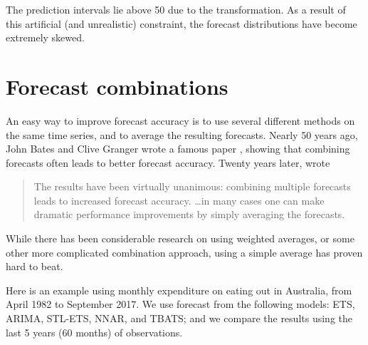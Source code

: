 \documentclass[]{book}
\begin{document}
The prediction intervals lie above 50 due to the transformation. As a result of this artificial (and unrealistic) constraint, the forecast distributions have become extremely skewed.

\hypertarget{combinations}{%
\section{Forecast combinations}\label{combinations}}

An easy way to improve forecast accuracy is to use several different methods on the same time series, and to average the resulting forecasts. Nearly 50 years ago, John Bates and Clive Granger wrote a famous paper \citep{BatesGranger1969}, showing that combining forecasts often leads to better forecast accuracy. Twenty years later, \citet{Clemen89} wrote

\begin{quote}
The results have been virtually unanimous: combining multiple forecasts leads
to increased forecast accuracy. \dots in many cases one can make dramatic performance improvements by simply averaging the forecasts.
\end{quote}

While there has been considerable research on using weighted averages, or some other more complicated combination approach, using a simple average has proven hard to beat.

Here is an example using monthly expenditure on eating out in Australia, from April 1982 to September 2017. We use forecast from the following models: ETS, ARIMA, STL-ETS, NNAR, and TBATS; and we compare the results using the last 5 years (60 months) of observations.
\end{document}
